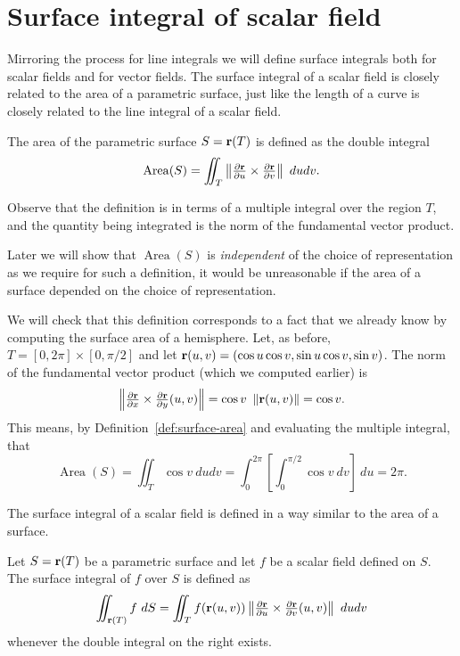 \section{Surface integral of scalar field}

Mirroring the process for line integrals we will define surface integrals both for scalar fields and for vector fields.
The surface integral of a scalar field is closely related to the area of a parametric surface, just like the length of a curve is closely related to the line integral of a scalar field.

\begin{definition}%
    \label{def:surface-area}
    The area of the parametric surface \(S = \mathbf{r}(T)\) is defined as the double integral
    \[
        \operatorname{Area}(S) = \iint_{T} \left\|\tfrac{\partial \mathbf{r}}{\partial u} \times \tfrac{\partial \mathbf{r}}{\partial v}\right\| \ du dv.
    \]
\end{definition}

Observe that the definition is in terms of a multiple integral over the region \(T\), and the quantity being integrated is the norm of the fundamental vector product.

Later we will show that \(\operatorname{Area}(S)\) is \emph{independent} of the choice of representation as we require for such a definition, it would be unreasonable if the area of a surface depended on the choice of representation.

We will check that this definition corresponds to a fact that we already know by computing the surface area of a hemisphere.
Let, as before, \( T = [0,2\pi]\times [0,\pi/2]\)
and let \(\mathbf{r}(u,v) = (\cos u \cos v, \sin u \cos v, \sin v)\).
The norm of the fundamental vector product (which we computed earlier) is
\[
    \left\|\tfrac{\partial \mathbf{r}}{\partial x} \times \tfrac{\partial \mathbf{r}}{\partial y}(u,v)\right\|
    = \cos v \  \left\|\mathbf{r}(u,v)\right\| = {\cos v}.
\]
This means, by Definition~\ref{def:surface-area} and evaluating the multiple integral, that
\[
    \operatorname{Area}(S)= \iint_{T} \cos v \ du dv
    = \int_{0}^{2\pi} \left[\int_{0}^{\pi/2} {\cos v} \ dv \right] \ du = {2\pi}.
\]


The surface integral of a scalar field is defined in a way similar to the area of a surface.

\begin{definition}%
    \label{def:surf-int-scalar}
    Let \(S = \mathbf{r}(T)\) be a parametric surface and let \(f\) be a scalar field defined on \(S\).
    The surface integral of \(f\) over \(S\) is defined as
    \[
        \iint_{\mathbf{r}(T)} f \ dS
        = \iint_{T} f(\mathbf{r}(u,v))  \left\|\tfrac{\partial \mathbf{r}}{\partial u} \times \tfrac{\partial \mathbf{r}}{\partial v}(u,v)\right\| \ du dv
    \]
    whenever the double integral on the right exists.
\end{definition}

